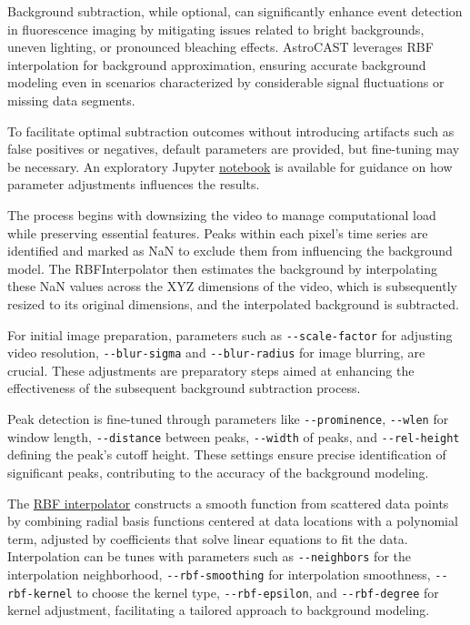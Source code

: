 Background subtraction, while optional, can significantly enhance event detection in fluorescence imaging by
mitigating issues related to bright backgrounds, uneven lighting, or pronounced bleaching effects. AstroCAST leverages \ac{RBF} interpolation for background approximation, ensuring accurate background modeling even in
scenarios characterized by considerable signal fluctuations or missing data segments.

To facilitate optimal subtraction outcomes without introducing artifacts such as false positives or negatives, default parameters are provided, but fine-tuning may be necessary. An exploratory Jupyter \href{https://github.com/janreising/astroCAST/blob/8451394bc0d810c4037011f0bcb9cba1f10d1e72/notebooks/dev/exploring_delta.ipynb}{notebook} is available for guidance on how parameter adjustments influences the results.

The process begins with downsizing the video to manage computational load while preserving essential features. Peaks
within each pixel's time series are identified and marked as NaN to exclude them from influencing the background
model. The RBFInterpolator then estimates the background by interpolating these NaN values across the XYZ dimensions
of the video, which is subsequently resized to its original dimensions, and the interpolated background is subtracted.

For initial image preparation, parameters such as \lstinline[style=bashStyle]{--scale-factor} for adjusting video
resolution, \lstinline[style=bashStyle]{--blur-sigma} and \lstinline[style=bashStyle]{--blur-radius} for image
blurring, are crucial. These adjustments are preparatory steps aimed at enhancing the effectiveness of the subsequent
background subtraction process.

Peak detection is fine-tuned through parameters like \lstinline[style=bashStyle]{--prominence}, \lstinline[style=
bashStyle]{--wlen} for window length, \lstinline[style=bashStyle]{--distance} between peaks, \lstinline[style=
bashStyle]{--width} of peaks, and \lstinline[style=bashStyle]{--rel-height} defining the peak's cutoff height. These
settings ensure precise identification of significant peaks, contributing to the accuracy of the background modeling.

The \href{https://docs.scipy.org/doc/scipy/reference/generated/scipy.interpolate.RBFInterpolator.html}{RBF interpolator} constructs a smooth function from
scattered data points by combining radial basis functions centered at data locations with a polynomial term, adjusted
by coefficients that solve linear equations to fit the data. Interpolation can be tunes with parameters such as \lstinline[style=bashStyle]{--neighbors} for the interpolation neighborhood, \lstinline[style=bashStyle]{--rbf-smoothing} for interpolation smoothness, \lstinline[style=bashStyle]{--rbf-kernel} to choose the kernel type, \lstinline[style=bashStyle]{--rbf-epsilon}, and \lstinline[style=bashStyle]{--rbf-degree} for kernel adjustment, facilitating a tailored approach to background modeling.

